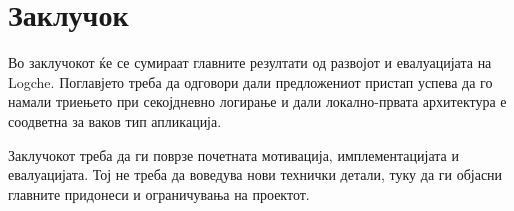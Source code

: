 \chapter{Заклучок}

Во заклучокот ќе се сумираат главните резултати од развојот и евалуацијата на Logche.
Поглавјето треба да одговори дали предложениот пристап успева да го намали триењето при секојдневно логирање и дали локално-првата архитектура е соодветна за ваков тип апликација.

Заклучокот треба да ги поврзе почетната мотивација, имплементацијата и евалуацијата.
Тој не треба да воведува нови технички детали, туку да ги објасни главните придонеси и ограничувања на проектот.
